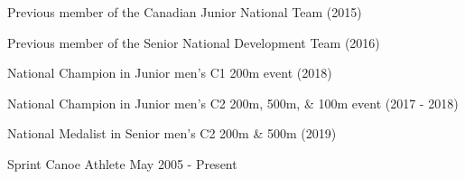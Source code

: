 \begin{cventries}
  \cventry
    {
      \begin{cvitems}
	  \item {Previous member of the Canadian Junior National Team (2015)}
	  \item {Previous member of the Senior National Development Team (2016)}
	  \item {National Champion in Junior men's C1 200m event (2018)}
	  \item {National Champion in Junior men's C2 200m, 500m, \& 100m event (2017 - 2018)}
	  \item {National Medalist in Senior men's C2 200m \& 500m (2019)}
      \end{cvitems}
		}
    {Sprint Canoe Athlete}
    {May 2005 - Present}
    {}
    {}
\end{cventries}
